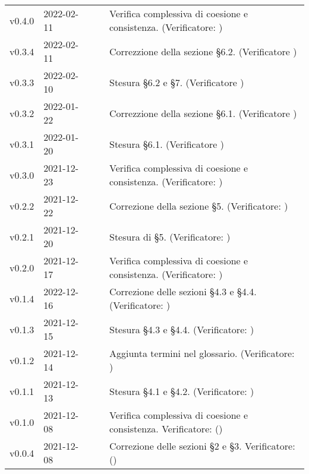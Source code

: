 \begin{longtable}{ m{}<{\centering}  m{}<{\centering}  m{}<{\centering}  m{}<{\centering}  m{}<{\centering} }
	v0.4.0& 2022-02-11 & \EP{} & \AM {} & Verifica complessiva di coesione e consistenza. (Verificatore: \textit{\MG})\\	

	v0.3.4& 2022-02-11 & \EP{} & \AM{} & Correzzione della sezione §6.2. (Verificatore \textit{\MG}) \\

	v0.3.3& 2022-02-10 & \EP{} & \AM{} & Stesura §6.2 e \S{}7. (Verificatore \textit{\MG}) \\

	v0.3.2& 2022-01-22 & \EP{} & \AM{} & Correzzione della sezione §6.1. (Verificatore \textit{\MG}) \\

	v0.3.1& 2022-01-20 & \EP{} & \AM{} & Stesura §6.1. (Verificatore \textit{\MG}) \\

	v0.3.0& 2021-12-23 & \EP{} & \AM {} & Verifica complessiva di coesione e consistenza. (Verificatore: \textit{\MG})\\	

	v0.2.2& 2021-12-22 & \EP{} & \AM{} & Correzione della sezione §5. (Verificatore: \textit{\MG})\\
	
	v0.2.1& 2021-12-20 & \EP{} & \AM{} & Stesura di §5. (Verificatore: \textit{\MG})\\

	v0.2.0& 2021-12-17 & \EP{} & \AM{} & Verifica complessiva di coesione e consistenza. (Verificatore: \textit{\MG})\\	
	
	v0.1.4& 2022-12-16 & \MB{} & \AM{} & Correzione delle sezioni §4.3 e §4.4. (Verificatore: \textit{\MG})\\
	
	v0.1.3& 2021-12-15 & \MB{} & \AM{} & Stesura §4.3 e §4.4. (Verificatore: \textit{\MG})\\

	v0.1.2& 2021-12-14 & \EP{} & \AM{} & Aggiunta termini nel glossario. (Verificatore: \textit{\MG})\\

	v0.1.1& 2021-12-13 & \MB{} & \AM{} & Stesura §4.1 e §4.2. (Verificatore: \textit{\MG})\\

	v0.1.0& 2021-12-08 & \MB{} & \AM{} & Verifica complessiva di coesione e consistenza. Verificatore: (\textit{\FP}) \\	

	v0.0.4& 2021-12-08 & \MB{} & \AM{} & Correzione delle sezioni §2 e §3. Verificatore: (\textit{\FP}) \\


\end{longtable}

